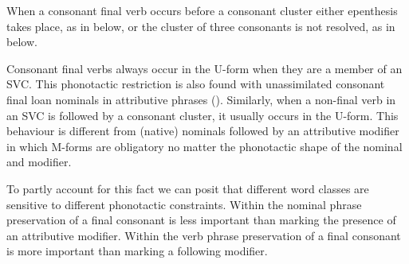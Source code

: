When a consonant final verb occurs before a consonant cluster
either epenthesis takes place, as in  below,
or the cluster of three consonants is not resolved,
as in  below.

\begin{exe}
	\label{ex2:130913-1, 2.30}
	\label{ex:120923-1, 6.59}
\end{exe}

Consonant final verbs always occur in the U-form
when they are a member of an SVC.
This phonotactic restriction is also found with
unassimilated consonant final loan nominals
in attributive phrases ().
Similarly, when a non-final verb in an SVC is followed by a consonant cluster,
it usually occurs in the U-form.
This behaviour is different from (native) nominals followed
by an attributive modifier in which M-forms are obligatory
no matter the phonotactic shape of the nominal and modifier.

To partly account for this fact we can
posit that different word classes are sensitive to different phonotactic constraints.
Within the nominal phrase preservation of a final consonant
is less important than marking the presence of an attributive modifier.
Within the verb phrase preservation of a final consonant is more
important than marking a following modifier.
